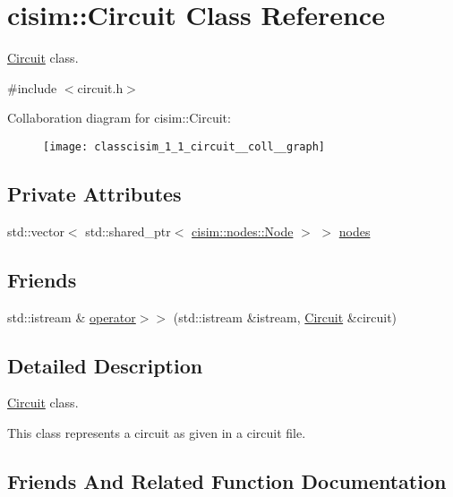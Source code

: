 \hypertarget{classcisim_1_1_circuit}{}\section{cisim\+:\+:Circuit Class Reference}
\label{classcisim_1_1_circuit}


\hyperlink{classcisim_1_1_circuit}{Circuit} class.  




{\ttfamily \#include $<$circuit.\+h$>$}



Collaboration diagram for cisim\+:\+:Circuit\+:
\nopagebreak
\begin{figure}[H]
\begin{center}
\leavevmode
\texttt{[image: classcisim\_1\_1\_circuit\_\_coll\_\_graph]}
\end{center}
\end{figure}
\subsection*{Private Attributes}
\begin{DoxyCompactItemize}
\item 
std\+::vector$<$ std\+::shared\+\_\+ptr$<$ \hyperlink{classcisim_1_1nodes_1_1_node}{cisim\+::nodes\+::\+Node} $>$ $>$ \hyperlink{classcisim_1_1_circuit_a310d2ff9cecd840314e8fa31d7664b19}{nodes}
\end{DoxyCompactItemize}
\subsection*{Friends}
\begin{DoxyCompactItemize}
\item 
std\+::istream \& \hyperlink{classcisim_1_1_circuit_a0a381487e00ea21d54490fbe01b7c3ff}{operator$>$$>$} (std\+::istream \&istream, \hyperlink{classcisim_1_1_circuit}{Circuit} \&circuit)
\end{DoxyCompactItemize}


\subsection{Detailed Description}
\hyperlink{classcisim_1_1_circuit}{Circuit} class. 

This class represents a circuit as given in a circuit file. 

\subsection{Friends And Related Function Documentation}
